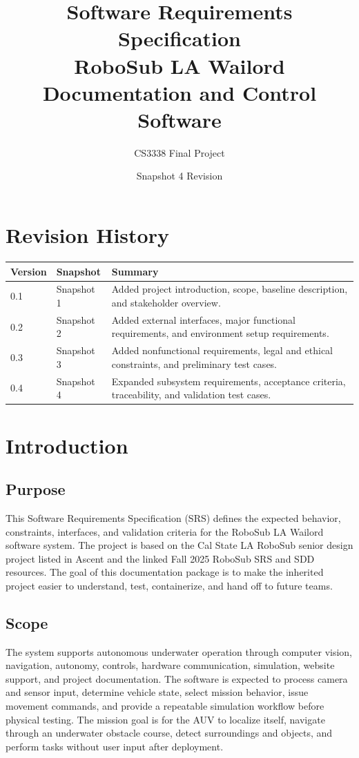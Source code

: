 \documentclass[12pt]{article}
\title{Software Requirements Specification\\RoboSub LA Wailord Documentation and Control Software}
\author{CS3338 Final Project}
\date{Snapshot 4 Revision}
\begin{document}
\maketitle
\tableofcontents
\newpage

\section{Revision History}
\begin{longtable}{|p{}|p{}|p{}|}
\hline
\textbf{Version} & \textbf{Snapshot} & \textbf{Summary} \\
\hline
0.1 & Snapshot 1 & Added project introduction, scope, baseline description, and stakeholder overview. \\
\hline
0.2 & Snapshot 2 & Added external interfaces, major functional requirements, and environment setup requirements. \\
\hline
0.3 & Snapshot 3 & Added nonfunctional requirements, legal and ethical constraints, and preliminary test cases. \\
\hline
0.4 & Snapshot 4 & Expanded subsystem requirements, acceptance criteria, traceability, and validation test cases. \\
\hline
\end{longtable}

\section{Introduction}
\subsection{Purpose}
This Software Requirements Specification (SRS) defines the expected behavior, constraints, interfaces, and validation criteria for the RoboSub LA Wailord software system. The project is based on the Cal State LA RoboSub senior design project listed in Ascent and the linked Fall 2025 RoboSub SRS and SDD resources. The goal of this documentation package is to make the inherited project easier to understand, test, containerize, and hand off to future teams.

\subsection{Scope}
The system supports autonomous underwater operation through computer vision, navigation, autonomy, controls, hardware communication, simulation, website support, and project documentation. The software is expected to process camera and sensor input, determine vehicle state, select mission behavior, issue movement commands, and provide a repeatable simulation workflow before physical testing. The mission goal is for the AUV to localize itself, navigate through an underwater obstacle course, detect surroundings and objects, and perform tasks without user input after deployment.
\end{document}
